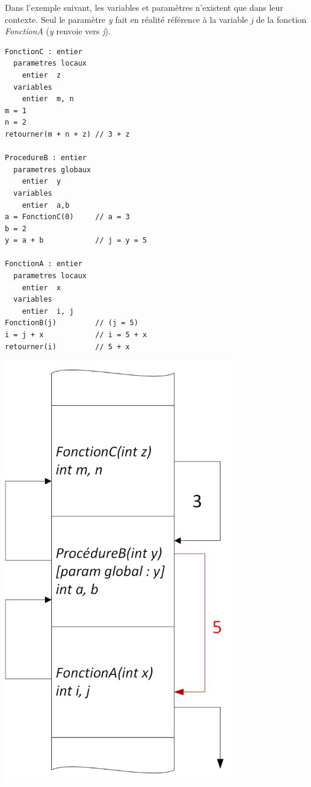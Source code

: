 \documentclass[11pt,a4paper]{article}
\begin{document}
Dans l'exemple suivant, les variables et paramètres n'existent que dans leur contexte.
Seul le paramètre \textit{y} fait en réalité référence à la variable \textit{j} de la fonction \textit{FonctionA} (\textit{y} renvoie vers \textit{j}).


\begin{table}[h!]
  \centering
  \begin{minipage}{0.45\textwidth}
    \centering
\begin{lstlisting}[style=algorithmique]
FonctionC : entier
  parametres locaux
    entier  z
  variables
    entier  m, n
m = 1
n = 2
retourner(m + n + z) // 3 + z

ProcedureB : entier
  parametres globaux
    entier  y
  variables
    entier  a,b
a = FonctionC(0)     // a = 3
b = 2
y = a + b            // j = y = 5

FonctionA : entier
  parametres locaux
    entier  x
  variables
    entier  i, j
FonctionB(j)         // (j = 5)
i = j + x            // i = 5 + x
retourner(i)         // 5 + x \end{lstlisting}
  \end{minipage}
  \hfillx
  \begin{minipage}{0.5\textwidth}
    \centering
\includegraphics[width=0.75\textwidth]{img/pointeurs/pile_appels_seule.png}
  \end{minipage}
\end{table}
\end{document}
